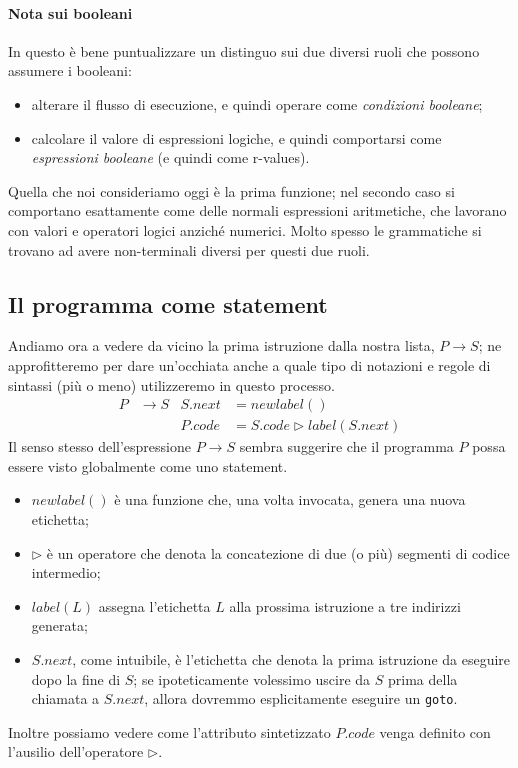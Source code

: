 \documentclass[class=book, crop=false, oneside, 12pt]{standalone}
\begin{document}
\paragraph{Nota sui booleani}
In questo è bene puntualizzare un distinguo sui due diversi ruoli che possono assumere i booleani:
\begin{itemize}
    \item alterare il flusso di esecuzione, e quindi operare come \emph{condizioni booleane};
    \item calcolare il valore di espressioni logiche, e quindi comportarsi come \emph{espressioni booleane} (e quindi come r-values).
\end{itemize}
Quella che noi consideriamo oggi è la prima funzione; nel secondo caso si comportano esattamente come delle normali espressioni aritmetiche, che lavorano con valori e operatori logici anziché numerici. Molto spesso le grammatiche si trovano ad avere non-terminali diversi per questi due ruoli.

\subsection{Il programma come statement}
Andiamo ora a vedere da vicino la prima istruzione dalla nostra lista, \(P \to S\); ne approfitteremo per dare un'occhiata anche a quale tipo di notazioni e regole di sintassi (più o meno) utilizzeremo in questo processo.
\begin{align*}
    P &\to S & S.next &= newlabel() \\
    & & P.code &= S.code \triangleright label(S.next)
\end{align*}
Il senso stesso dell'espressione \(P \to S\) sembra suggerire che il programma \(P\) possa essere visto globalmente come uno statement.
\begin{itemize}
    \item \(newlabel()\) è una funzione che, una volta invocata, genera una nuova etichetta;
    \item \(\triangleright\) è un operatore che denota la concatezione di due (o più) segmenti di codice intermedio;
    \item \(label(L)\) assegna l'etichetta \(L\) alla prossima istruzione a tre indirizzi generata;
    \item \(S.next\), come intuibile, è l'etichetta che denota la prima istruzione da eseguire dopo la fine di \(S\); se ipoteticamente volessimo uscire da \(S\) prima della chiamata a \(S.next\), allora dovremmo esplicitamente eseguire un \texttt{goto}.
\end{itemize}
Inoltre possiamo vedere come l'attributo sintetizzato \(P.code\) venga definito con l'ausilio dell'operatore \(\triangleright\).
\end{document}
